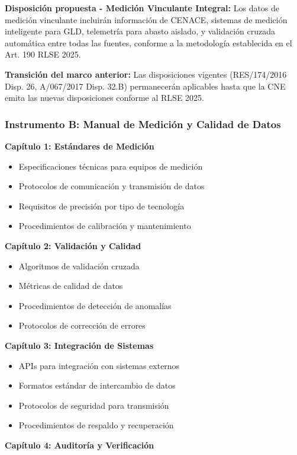 \documentclass{cel}
\begin{document}
\textbf{Disposición propuesta - Medición Vinculante Integral:} \textquotedbl{}Los datos de medición vinculante incluirán información de CENACE, sistemas de medición inteligente para GLD, telemetría para abasto aislado, y validación cruzada automática entre todas las fuentes, conforme a la metodología establecida en el Art. 190 RLSE 2025.\textquotedbl{}


\textbf{Transición del marco anterior:} Las disposiciones vigentes (RES/174/2016 Disp. 26, A/067/2017 Disp. 32.B) permanecerán aplicables hasta que la CNE emita las nuevas disposiciones conforme al RLSE 2025.


\subsubsection{Instrumento B: Manual de Medición y Calidad de Datos}
\nopagebreak

\textbf{Capítulo 1: Estándares de Medición}


\begin{itemize}
\item Especificaciones técnicas para equipos de medición
\item Protocolos de comunicación y transmisión de datos
\item Requisitos de precisión por tipo de tecnología
\item Procedimientos de calibración y mantenimiento

\end{itemize}
\textbf{Capítulo 2: Validación y Calidad}


\begin{itemize}
\item Algoritmos de validación cruzada
\item Métricas de calidad de datos
\item Procedimientos de detección de anomalías
\item Protocolos de corrección de errores

\end{itemize}
\textbf{Capítulo 3: Integración de Sistemas}


\begin{itemize}
\item APIs para integración con sistemas externos
\item Formatos estándar de intercambio de datos
\item Protocolos de seguridad para transmisión
\item Procedimientos de respaldo y recuperación

\end{itemize}
\textbf{Capítulo 4: Auditoría y Verificación}
\end{document}
